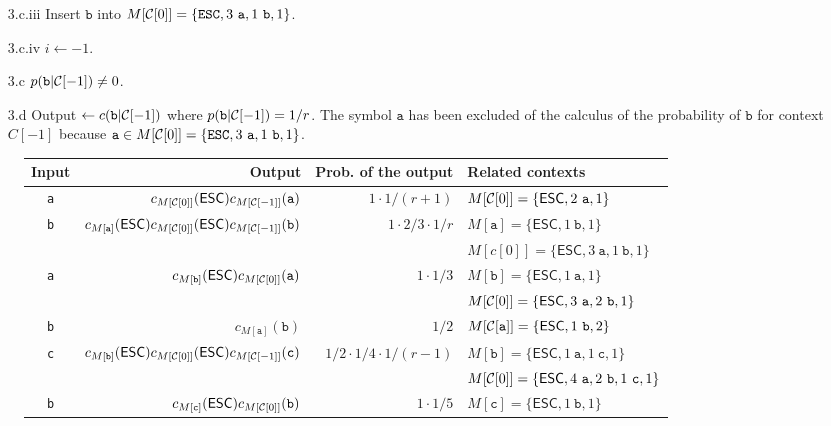 \begin{itemize}
\begin{enumerate}
  \item [3.c.iii] Insert $\mathtt{b}$ into $M[{\cal C}[0]] = \{\mathtt{ESC},3~\mathtt{a},1~\mathtt{b},1\}$.
  \item [3.c.iv] $i\leftarrow -1$.
  \item [3.c] $p(\mathtt{b}|{\cal C}[-1])\neq 0$.
  \item [3.d] Output $\leftarrow c(\mathtt{b}|{\cal C}[-1])$ where $p(\mathtt{b}|{\cal C}[-1]) = 1/r$. The symbol $\mathtt{a}$ has been excluded of the calculus of the probability of $\mathtt{b}$ for context $C[-1]$ because $\mathtt{a}\in M[{\cal C}[0]] = \{\mathtt{ESC},3~ \mathtt{a},1~ \mathtt{b},1\}$.
      \end{enumerate}
\end{itemize}

\begin{figure}
\begin{center}
  \begin{tabular}{crrl}
    Input & Output & Prob. of the output & Related contexts\\
    \hline
    {\tt a} & $c_{M[{\cal C}[0]]}(\mathsf{ESC})c_{M[{\cal C}[-1]]}(\mathtt{a})$ & $1\cdot 1/(r+1)$ & $M[{\cal C}[0]]=\{\mathsf{ESC},2~\mathtt{a},1\}$\\
    {\tt b} & $c_{M[\texttt{a}]}(\mathsf{ESC})c_{M[{\cal C}[0]]}(\mathsf{ESC})c_{M[{\cal C}[-1]]}(\mathtt{b})$ & $1\cdot 2/3\cdot 1/r$ & $M[\mathtt{a}]=\{\mathsf{ESC},1~\mathtt{b},1\}$\\
    ~       & & & $M[c[0]]=\{\mathsf{ESC},3~\mathtt{a},1~\mathtt{b},1\}$\\
    {\tt a} & $c_{M[\texttt{b}]}(\mathsf{ESC})c_{M[{\cal C}[0]]}(\mathtt a)$ & $1\cdot 1/3$ & $M[\mathtt{b}]=\{\mathsf{ESC},1~\mathtt{a},1\}$\\
    ~       & & & $M[{\cal C}[0]]=\{\mathsf{ESC},3~\mathtt{a},2~\mathtt{b},1\}$\\
    {\tt b} & $c_{M[\mathtt{a}]}(\mathtt b)$ & $1/2$ & $M[{\cal C}[\mathtt{a}]]=\{\mathsf{ESC},1~\mathtt{b},2\}$\\
    {\tt c} & $c_{M[\mathtt{b}]}(\mathsf{ESC})c_{M[{\cal C}[0]]}(\mathsf{ESC})c_{M[{\cal C}[-1]]}(\mathtt c)$ & $1/2\cdot 1/4\cdot 1/(r-1)$ & $M[\mathtt{b}]=\{\mathsf{ESC},1~\mathtt{a},1~\mathtt{c},1\}$\\
    ~       & & & $M[{\cal C}[0]]=\{\mathsf{ESC},4~\mathtt{a},2~\mathtt{b},1~\mathtt{c},1\}$\\
    {\tt b} & $c_{M[\texttt{c}]}(\mathsf{ESC})c_{M[{\cal C}[0]]}(\mathtt b)$ & $1\cdot 1/5$ & $M[\mathtt{c}]=\{\mathsf{ESC},1~\mathtt{b},1\}$\\

\end{tabular}
\end{center}
\end{figure}
